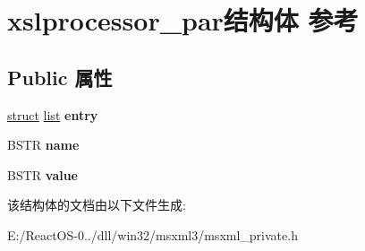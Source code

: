 \hypertarget{structxslprocessor__par}{}\section{xslprocessor\+\_\+par结构体 参考}
\label{structxslprocessor__par}
\subsection*{Public 属性}
\begin{DoxyCompactItemize}
\item 
\mbox{\label{structxslprocessor__par_a2c2a7a47f4a67a3d03cc6ca42a31c03b}} 
\hyperlink{interfacestruct}{struct} \hyperlink{classlist}{list} {\bfseries entry}
\item 
\mbox{\label{structxslprocessor__par_ae073bbd83bdd5eb8f4a05e5c19732405}} 
B\+S\+TR {\bfseries name}
\item 
\mbox{\label{structxslprocessor__par_aab875622f0881ab6985146eb9bdea71c}} 
B\+S\+TR {\bfseries value}
\end{DoxyCompactItemize}


该结构体的文档由以下文件生成\+:\begin{DoxyCompactItemize}
\item 
E\+:/\+React\+O\+S-\/0../dll/win32/msxml3/msxml\+\_\+private.\+h\end{DoxyCompactItemize}
